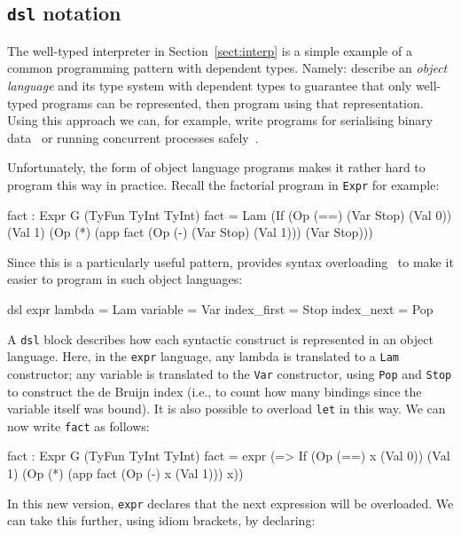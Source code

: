 \subsection{\texttt{dsl} notation}

The well-typed interpreter in Section~\ref{sect:interp} is a simple example of a common programming pattern with dependent types.
Namely: describe an \emph{object language} and its type system with dependent types to guarantee that only well-typed programs can be represented, then program using that representation.
Using this approach we can, for example, write programs for serialising binary data~\cite{plpv11} or running concurrent processes safely~\cite{cbconc-fi}.

Unfortunately, the form of object language programs makes it rather hard to program this way in practice.
Recall the factorial program in \texttt{Expr} for example:

\begin{code}
fact : Expr G (TyFun TyInt TyInt)
fact = Lam (If (Op (==) (Var Stop) (Val 0))
               (Val 1) (Op (*) (app fact (Op (-) (Var Stop) (Val 1))) 
                               (Var Stop)))
\end{code}

\noindent
Since this is a particularly useful pattern, \Idris{} provides syntax overloading~\cite{res-dsl-padl12} to make it easier to program in such object languages:

\begin{code}
dsl expr
    lambda      = Lam
    variable    = Var
    index_first = Stop
    index_next  = Pop
\end{code} 

\noindent
A \texttt{dsl} block describes how each syntactic construct is represented in an object language.
Here, in the \texttt{expr} language, any \Idris{} lambda is translated to a \texttt{Lam} constructor; any variable is translated to the \texttt{Var} constructor, using \texttt{Pop} and \texttt{Stop} to construct the de Bruijn index (i.e., to count how many bindings since the variable itself was bound).
It is also possible to overload \texttt{let} in this way. We can now write \texttt{fact} as follows:

\begin{code}
fact : Expr G (TyFun TyInt TyInt)
fact = expr (\x => If (Op (==) x (Val 0))
                      (Val 1) (Op (*) (app fact (Op (-) x (Val 1))) x))
\end{code} 

\noindent
In this new version, \texttt{expr} declares that the next expression will be overloaded.
We can take this further, using idiom brackets, by declaring:

